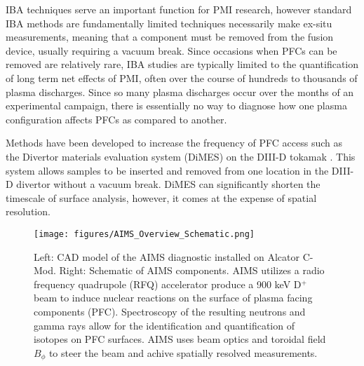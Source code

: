 \documentclass[11pt,a4paper,twocolumn]{article}
\begin{document}

 
IBA techniques serve an important function for PMI research, however standard IBA methods are fundamentally limited techniques necessarily make ex-situ measurements, meaning that a component must be removed from the fusion device, usually requiring a vacuum break.  Since occasions when PFCs can be removed are relatively rare, IBA studies are typically limited to the quantification of long term net effects of PMI, often over the course of hundreds to thousands of plasma discharges.  Since so many plasma discharges occur over the months of an experimental campaign, there is essentially no way to diagnose how one plasma configuration affects PFCs as compared to another.

Methods have been developed to increase the frequency of PFC access such as the Divertor materials evaluation system (DiMES) on the DIII-D tokamak \cite{wong1998divertor}.  This system allows samples to be inserted and removed from one location in the DIII-D divertor without a vacuum break.  DiMES can significantly shorten the timescale of surface analysis, however, it comes at the expense of spatial resolution.

\begin{figure*}[h]
 \centering
  \texttt{[image: figures/AIMS\_Overview\_Schematic.png]}
 \caption{Left: CAD model of the AIMS diagnostic installed on Alcator C-Mod.  Right: Schematic of AIMS components.  AIMS utilizes a radio frequency quadrupole (RFQ) accelerator produce a 900 keV D$^+$ beam to induce nuclear reactions on the surface of plasma facing components (PFC). Spectroscopy of the resulting neutrons and gamma rays allow for the identification and quantification of isotopes on PFC surfaces.  AIMS uses beam optics and toroidal field $B_\phi$ to steer the beam and achive spatially resolved measurements.}
 \label{fig:AIMSOverviewSchematic0}
\end{figure*}
\end{document}
